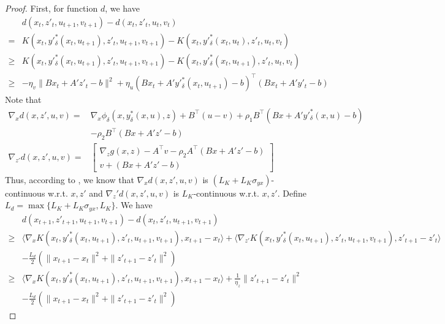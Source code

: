 \documentclass{article}
\theoremstyle{plain}
\theoremstyle{definition}
\theoremstyle{remark}
\begin{document}
\begin{proof}
    
First, for function $d$, we have
\begin{align*}
    &d(x_t, z'_t, u_{t+1}, v_{t+1})-d(x_t, z'_t, u_t, v_t)\\
    =&K(x_t, y'^*_\delta(x_t, u_{t+1}), z'_t, u_{t+1}, v_{t+1})-K(x_t,y'^*_\delta(x_t, u_{t}), z'_t, u_t, v_t)\\
    \geq&K(x_t, y'^*_\delta(x_t, u_{t+1}), z'_t, u_{t+1}, v_{t+1})-K(x_t,y'^*_\delta(x_t, u_{t+1}), z'_t, u_t, v_t)\\
    \geq&-\eta_v\|Bx_t+A'z'_t-b\|^2+\eta_u(Bx_t+A'y'^*_\delta(x_t,u_{t+1})-b)^\top(Bx_t+A'y'_t-b)
\end{align*}
Note that
\begin{align*}
    \nabla_x d(x, z',u,v)=&\nabla_x \phi_\delta(x, y^*_\delta(x, u), z)+B^\top (u-v)+ \rho_1B^\top(Bx+A'y'^*_\delta(x, u)-b)\\
    &-\rho_2B^\top(Bx+A'z'-b)\\
    \nabla_{z'} d(x, z',u,v)=&\begin{bmatrix}
    \nabla_z g(x,z)-A^\top v-\rho_2A^\top (Bx+A'z'-b)\\
    v+(Bx+A'z'-b)
    \end{bmatrix}
\end{align*}
Thus, according to , we know that
$\nabla_x d(x, z',u,v)$ is $(L_K+L_K\sigma_{yx})$-continuous w.r.t. $x,z'$ and $\nabla_z' d(x, z',u,v)$ is $L_K$-continuous w.r.t. $x,z'$. Define $L_d=\max\{L_K+L_K\sigma_{yx}, L_K\}$. We have
\begin{align*}
    &d(x_{t+1}, z'_{t+1}, u_{t+1}, v_{t+1})-d(x_t,z'_t, u_{t+1}, v_{t+1})\\
    \geq&\langle\nabla_x K(x_t, y'^*_\delta(x_t,u_{t+1}), z'_t, u_{t+1}, v_{t+1}), x_{t+1}-x_t\rangle+\langle\nabla_{z'} K(x_t, y'^*_\delta(x_t,u_{t+1}), z'_t, u_{t+1},v_{t+1}), z'_{t+1}-z'_t\rangle\\
    &-\frac{L_d}{2}(\|x_{t+1}-x_t\|^2+\|z'_{t+1}-z'_t\|^2)\\
    \geq&\langle\nabla_x K(x_t, y'^*_\delta(x_t,u_{t+1}), z'_t, u_{t+1}, v_{t+1}), x_{t+1}-x_t\rangle+\frac{1}{\eta_z}\|z'_{t+1}-z'_t\|^2\\
    &-\frac{L_d}{2}(\|x_{t+1}-x_t\|^2+\|z'_{t+1}-z'_t\|^2)
\end{align*}


\end{proof}
\end{document}
